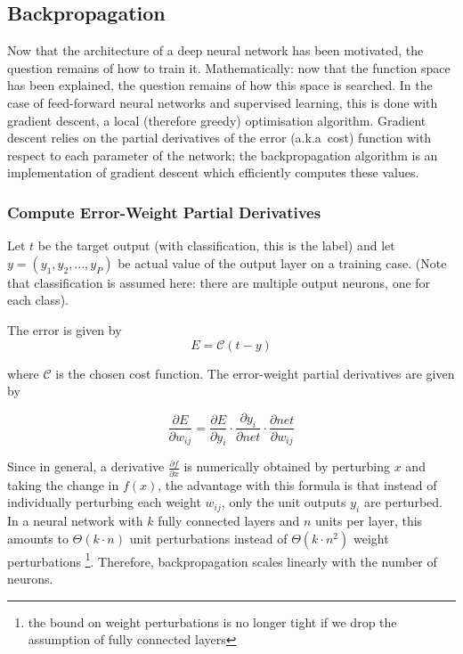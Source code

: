 \documentclass[a4paper,11pt]{article}
\begin{document}
\clearpage

\subsection{Backpropagation}

Now that the architecture of a deep neural network has been motivated, the question remains of how to train it. Mathematically: now that the function space has been explained, the question remains of how this space is searched. In the case of feed-forward neural networks and supervised learning, this is done with gradient descent, a local (therefore greedy) optimisation algorithm. Gradient descent relies on the partial derivatives of the error (a.k.a\ cost) function with respect to each parameter of the network; the backpropagation algorithm is an implementation of gradient descent which efficiently computes these values.
  
\subsubsection{Compute Error-Weight Partial Derivatives}

Let $t$ be the target output (with classification, this is the label) and let $y = (y_{1}, y_{2}, ..., y_{P})$ be actual value of the output layer on a training case. (Note that classification is assumed here: there are multiple output neurons, one for each class).

The error is given by 
\begin{equation}
E = \mathcal{C}(t-y)
\end{equation}

where $\mathcal{C}$ is the chosen cost function. The error-weight partial derivatives are given by

\begin{equation}
\frac{\partial{E}}{\partial{w_{ij}}} = \frac{\partial{E}}{\partial{y_{i}}} \cdot \frac{\partial{y_{i}}}{\partial{net}} \cdot \frac{\partial{net}}{\partial{w_{ij}}}
\end{equation}

Since in general, a derivative $\frac{\partial{f}}{\partial{x}}$ is numerically obtained by perturbing $x$ and taking the change in $f(x)$, the advantage with this formula is that instead of individually perturbing each weight $w_{ij}$, only the unit outputs $y_{i}$ are perturbed. In a neural network with $k$ fully connected layers and $n$ units per layer, this amounts to $\Theta(k \cdot n)$ unit perturbations instead of $\Theta(k \cdot n^{2})$ weight perturbations \footnote{the bound on weight perturbations is no longer tight if we drop the assumption of fully connected layers}. Therefore, backpropagation scales linearly with the number of neurons. \\
\end{document}
